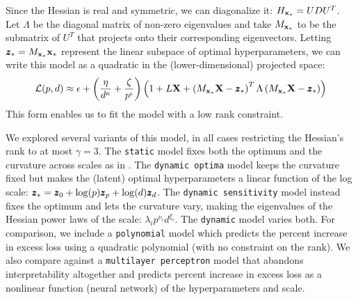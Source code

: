 Since the Hessian is real and symmetric, we can diagonalize it: $H_{\mathbf{x}_*} = U D U^T$. Let $\Lambda$ be the diagonal matrix of non-zero eigenvalues and take $M_{\mathbf{x}_*}$ to be the submatrix of $U^T$ that projects onto their corresponding eigenvectors. Letting $\pmb{z}_* = M_{\mathbf{x}_*} \mathbf{x}_*$ represent the linear subspace of optimal hyperparameters, we can write this model as a quadratic in the (lower-dimensional) projected space:
%
\begin{equation}\label{eq:static-empirical-model_projection}
    \mathcal{L}(p, d) \approx \epsilon + \left(\frac{\eta}{d^\kappa} + \frac{\zeta}{p^\iota}\right)\left(1 + L \mathbf{X} + \left(M_{\mathbf{x}_*} \mathbf{X} - \pmb{z}_*\right)^T \Lambda \left(M_{\mathbf{x}_*} \mathbf{X} - \pmb{z}_*\right)\right)
\end{equation}
%
This form enables us to fit the model with a low rank constraint.

We explored several variants of this model, in all cases restricting the Hessian's rank to at most $\gamma = 3$. The \texttt{static} model fixes both the optimum and the curvature across scales as in . The \texttt{dynamic optima} model keeps the curvature fixed but makes the (latent) optimal hyperparameters a linear function of the log scale: $\pmb{z}_* = \pmb{z}_0 + \log(p) \pmb{z}_{p} + \log(d) \pmb{z}_d$. The \texttt{dynamic sensitivity} model instead fixes the optimum and lets the curvature vary, making the eigenvalues of the Hessian power laws of the scale: $\lambda_i p^{\nu_i} d^{\xi_i}$. The \texttt{dynamic} model varies both. For comparison, we include a \texttt{polynomial} model which predicts the percent increase in excess loss using a quadratic polynomial (with no constraint on the rank). We also compare against a \texttt{multilayer perceptron} model that abandons interpretability altogether and predicts percent increase in excess loss as a nonlinear function (neural network) of the hyperparameters and scale.

